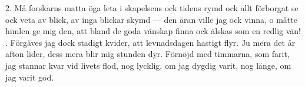 \setlength{\columnsep}{0.2cm}
\begin{multicols}{2}
2.  Må forskarns matta öga leta
    i skapelsens ock tidens rymd
    ock allt förborgat se ock veta
    av blick, av inga blickar skymd —
    den äran ville jag ock vinna,
    o måtte himlen ge mig den,
    att bland de goda vänskap finna
    ock älskas som en redlig vän!
\vfill{}.  Förgäves jag dock stadigt kvider,
    att levnadsdagen hastigt flyr.
    Ju mera det år afton lider,
    dess mera blir mig stunden dyr.
    Förnöjd med timmarna, som farit,
    jag stannar kvar vid livets flod,
    nog lycklig, om jag dygdig varit,
    nog länge, om jag varit god.
\end{multicols}
